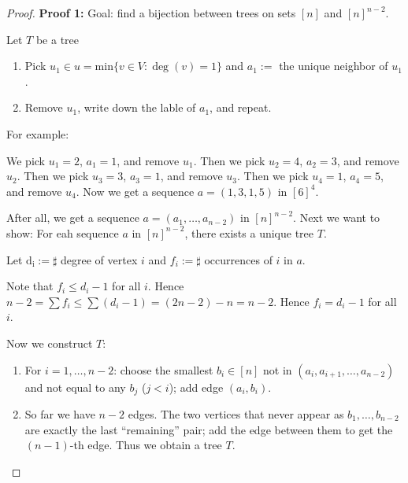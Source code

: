 \documentclass[11pt, a4paper]{ctexrep}
\begin{document}
\begin{proof}
    \textbf{Proof 1:}
    Goal: find a bijection between trees on sets $ [n] $ and $ [n]^{n-2} $.

    Let $ T $ be a tree

    \begin{enumerate}
        \item Pick $ u_1 \in u= \mathrm{min}\{ v \in V: \deg (v)=1  \} $ and $ a_1 :=  $ the unique neighbor of $ u_1 $.
        \item Remove $ u_1 $, write down the lable of $ a_1 $, and repeat.
    \end{enumerate}

    For example:
    \begin{center}
    \end{center}

    We pick $u_1=2$, $a_1=1$, and remove $u_1$. Then we pick $u_2=4$, $a_2=3$, and remove $u_2$. Then we pick $u_3=3$, $a_3=1$, and remove $u_3$. Then we pick $u_4=1$, $a_4=5$, and remove $u_4$. Now we get a sequence $ a=(1,3,1,5) $ in $ [6]^{4} $.


    After all, we get a sequence $ a=(a_1, \ldots, a_{n-2}) $ in $ [n]^{n-2} $. Next we want to show: For eah sequence $ a $ in $ [n]^{n-2} $, there exists a unique tree $ T $.

    Let $ \mathrm{d_i} := \sharp $ degree of vertex $ i $ and $ f_i := \sharp $ occurrences of $ i $ in $ a $.

    Note that $ f_i \le d_i -1 $ for all $ i $. Hence $ n-2=\sum f_i \le \sum (d_i-1)=(2n-2)-n =n-2 $. Hence $ f_i=d_i -1 $ for all $ i $.

    Now we construct $ T $:
    \begin{enumerate}
        \item For $ i=1,\ldots,n-2 $: choose the smallest $ b_i \in [n] $ not in $ (a_i, a_{i+1}, \ldots, a_{n-2}) $ and not equal to any $ b_j $ ($ j<i $); add edge $ (a_i, b_i) $.
        \item So far we have $ n-2 $ edges. The two vertices that never appear as $ b_1,\ldots,b_{n-2} $ are exactly the last ``remaining'' pair; add the edge between them to get the $ (n-1) $-th edge. Thus we obtain a tree $ T $.
    \end{enumerate}


\end{proof}
\end{document}
